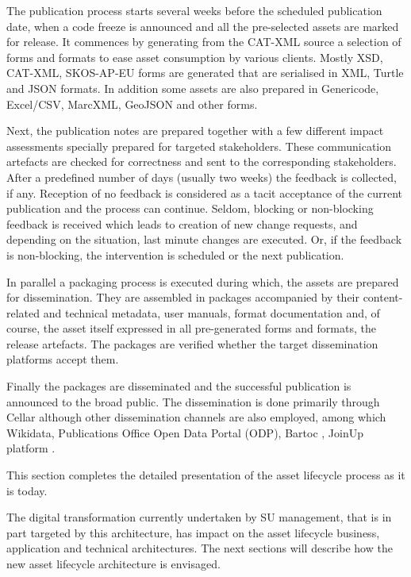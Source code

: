 	The publication process starts several weeks before the scheduled publication date, when a code freeze is announced and all the pre-selected assets are marked for release. It commences by generating from the CAT-XML source a selection of forms and formats to ease asset consumption by various clients. Mostly XSD, CAT-XML, SKOS-AP-EU forms are generated that are serialised in XML, Turtle and JSON formats. In addition some assets are also prepared in Genericode, Excel/CSV, MarcXML, GeoJSON and other forms. 
	
	Next, the publication notes are prepared together with a few different impact assessments specially prepared for targeted stakeholders. These communication artefacts are checked for correctness and sent to the corresponding stakeholders. After a predefined number of days (usually two weeks) the feedback is collected, if any. Reception of no feedback is considered as a tacit acceptance of the current publication and the process can continue. Seldom, blocking or non-blocking feedback is received which leads to creation of new change requests, and depending on the situation, last minute changes are executed. Or, if the feedback is non-blocking, the intervention is scheduled or the next publication. 
	
	In parallel a packaging process is executed during which, the assets are prepared for dissemination. They are assembled in packages accompanied by their content-related and technical metadata, user manuals, format documentation and, of course, the asset itself expressed in all pre-generated forms and formats, the release artefacts. The packages are verified whether the target dissemination platforms accept them.
	
	Finally the packages are disseminated and the successful publication is announced to the broad public. The dissemination is done primarily through Cellar\citep{cdm-francesconi2015ontology} although other dissemination channels are also employed, among which Wikidata\citep{vrandevcic2014wikidata}, Publications Office Open Data Portal (ODP), Bartoc \citep{ledl2016describing}, JoinUp platform \citep{hillenius2013free}.
	
	This section completes the detailed presentation of the asset lifecycle process as it is today. 
	
	The digital transformation currently undertaken by SU management, that is in part targeted by this architecture, has impact on the asset lifecycle business, application and technical architectures. The next sections will describe how the new asset lifecycle architecture is envisaged. 
		
